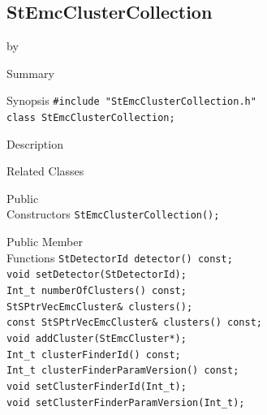 \documentclass[twoside]{article}
\newcommand{\entrylabel}[1]{\mbox{\textbf{{#1}}}\hfil}%
\newenvironment{entry}
{\begin{list}{}%
    {\renewcommand{\makelabel}{\entrylabel}%
     \setlength{\labelwidth}{90pt}%
     \setlength{\leftmargin}{\labelwidth}
     \advance\leftmargin by \labelsep%
      }%
    }%
  {\end{list}}
\newcommand{\Entrylabel}[1]%
{\raisebox{0pt}[1ex][0pt]{\makebox[\labelwidth][l]%
    {\parbox[t]{\labelwidth}{\hspace{0pt}\textbf{{#1}}}}}}
\newenvironment{Entry}%
{\renewcommand{\entrylabel}{\Entrylabel}\begin{entry}}%
  {\end{entry}}
\begin{document}
\subsection{StEmcClusterCollection}
\label{sec:StEmcClusterCollection}
\begin{Entry}
\item[Summary]
\item[Synopsis]
    \verb+#include "StEmcClusterCollection.h"+\\
    \verb+class StEmcClusterCollection;+\\
\item[Description]
\item[Related Classes]
\item[Public\\ Constructors]
    \verb+StEmcClusterCollection();+\\
\item[Public Member\\ Functions]
    \verb+StDetectorId detector() const;+\\
    \verb+void setDetector(StDetectorId);+\\
    \verb+Int_t numberOfClusters() const;+\\
    \verb+StSPtrVecEmcCluster& clusters();+\\
    \verb+const StSPtrVecEmcCluster& clusters() const;+\\
    \verb+void addCluster(StEmcCluster*);+\\
    \verb+Int_t clusterFinderId() const;+\\
    \verb+Int_t clusterFinderParamVersion() const;+\\
    \verb+void setClusterFinderId(Int_t);+\\
    \verb+void setClusterFinderParamVersion(Int_t);+\\
\end{Entry}
\clearpage
\end{document}
